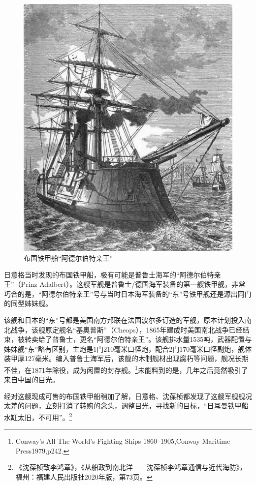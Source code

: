 \documentclass[12pt,UTF8]{ctexbook}
\begin{document}
\begin{figure}[htbp]
	\centering
	\includegraphics[width=1\linewidth]{Images/44}
	\caption{布国铁甲船“阿德尔伯特亲王”}
	\label{fig:1}
\end{figure}

日意格当时发现的布国铁甲船，极有可能是普鲁士海军的“阿德尔伯特亲王”（Prinz Adalbert）。这艘军舰是普鲁士/德国海军装备的第一艘铁甲舰，非常巧合的是，“阿德尔伯特亲王”号与当时日本海军装备的“东”号铁甲舰还是源出同门的同型姊妹舰。

该舰和日本的“东”号都是美国南方邦联在法国波尔多订造的军舰，原本计划投入南北战争，该舰原定舰名“基奥普斯”（Cheops），1865年建成时美国南北战争已经结束，被转卖给了普鲁士，更名“阿德尔伯特亲王”。该舰排水量1535吨，武器配置与姊妹舰“东”略有区别，主炮是1门210毫米口径炮，配合2门170毫米口径副炮，舰体装甲厚127毫米。编入普鲁士海军后，该舰的木制舰材出现腐朽等问题，舰况长期不佳，在1871年除役，成为闲置的封存舰。\footnote{Conway's All The World's Fighting Ships 1860--1905,Conway Maritime Press1979,p242.}未能料到的是，几年之后竟然吸引了来自中国的目光。

经对这艘现成可售的布国铁甲船稍加了解，日意格、沈葆桢都发现了这艘军舰舰况太差的问题，立刻打消了转购的念头，调整目光，寻找新的目标，“日耳曼铁甲船水缸太旧，不可用”。\footnote{《沈葆桢致李鸿章》，《从船政到南北洋——沈葆桢李鸿章通信与近代海防》，福州：福建人民出版社2020年版，第73页。}
\end{document}
